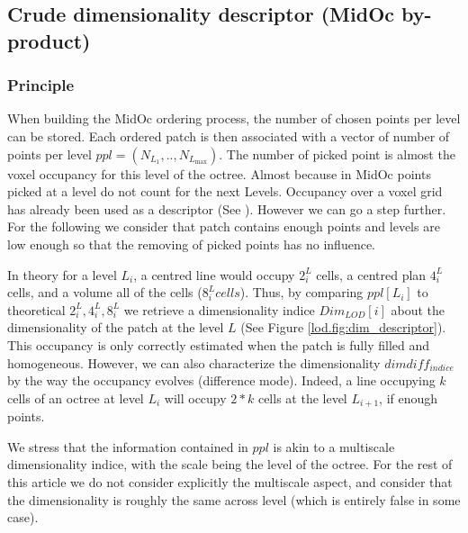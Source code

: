	\subsection{Crude dimensionality descriptor (MidOc by-product)} 
		\label{lod.method.dimdescriptor}
		\subsubsection{Principle}
		When building the MidOc ordering process, the number of chosen points per level can be stored.
		Each ordered patch is then associated with a vector of number of points per level $ppl=(N_{L_{1}},..,N_{L_{\text{max}}})$.
		The number of picked point is almost the voxel occupancy for this level of the octree.
		Almost because in MidOc points picked at a level do not count for the next Levels.
		Occupancy over a voxel grid has already been used as a descriptor (See \cite{Bustos2005}).
		However we can go a step further.
		For the following we consider that patch contains enough points and levels are low enough so that the removing of picked points has no influence.
		
		In theory for a level $L_i$, a centred line would occupy $2^L_i$ cells, a centred plan $4^L_i$ cells, and a volume all of the cells ($8^L_i cells$).
		Thus, by comparing $ppl[L_i]$ to theoretical $2^L_i, 4^L_i, 8^L_i$ we retrieve a dimensionality indice  $Dim_{LOD}[i]$  about the dimensionality of the patch at the level $L$ (See Figure \ref{lod.fig:dim_descriptor}). 
		This occupancy is only correctly estimated when the patch is fully filled and homogeneous. 
		However, we can also characterize the dimensionality $dimdiff_{indice}$ by the way the occupancy evolves (difference mode).
		Indeed, a line occupying $k$ cells of an octree at level $L_i$ will occupy $2*k$ cells at the level $L_{i+1}$, if enough points.
		
		We stress that the information contained in $ppl$ is akin to a multiscale dimensionality indice,
		with the scale being the level of the octree.
		For the rest of this article we do not consider explicitly the multiscale aspect,
		 and consider that the dimensionality is roughly the same across level 
		 (which is entirely false in some case).
		
